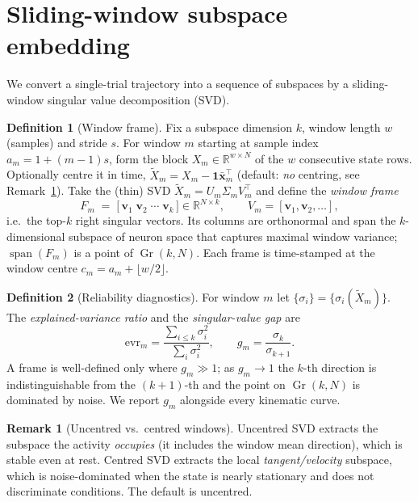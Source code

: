 \documentclass[11pt]{article}
\newcommand{\R}{\mathbb{R}}
\newcommand{\Gr}{\operatorname{Gr}}
\newcommand{\Span}{\operatorname{span}}
\theoremstyle{definition}
\newtheorem{definition}{Definition}
\newtheorem{remark}{Remark}
\begin{document}
\section{Sliding-window subspace embedding}
\label{sec:embed}

We convert a single-trial trajectory into a sequence of subspaces by a sliding-window
singular value decomposition (SVD).

\begin{definition}[Window frame]
\label{def:frame}
Fix a subspace dimension $k$, window length $w$ (samples) and stride $s$. For window
$m$ starting at sample index $a_m = 1 + (m-1)s$, form the block
$X_m \in \R^{w\times N}$ of the $w$ consecutive state rows. Optionally centre it in
time, $\tilde{X}_m = X_m - \mathbf{1}\bar{\bm{x}}_m^\top$ (default: \emph{no}
centring, see Remark~\ref{rem:center}). Take the (thin) SVD
$\tilde{X}_m = U_m \Sigma_m V_m^\top$ and define the \emph{window frame}
\begin{equation}
F_m \;=\; \big[\,\bm{v}_1 \; \bm{v}_2 \; \cdots \; \bm{v}_k\,\big]\in\R^{N\times k},
\qquad V_m = [\bm{v}_1,\bm{v}_2,\dots],
\end{equation}
i.e.\ the top-$k$ right singular vectors. Its columns are orthonormal and span the
$k$-dimensional subspace of neuron space that captures maximal window variance;
$\Span(F_m)$ is a point of $\Gr(k,N)$. Each frame is time-stamped at the window
centre $c_m = a_m + \lfloor w/2\rfloor$.
\end{definition}

\begin{definition}[Reliability diagnostics]
For window $m$ let $\{\sigma_i\}=\{\sigma_i(\tilde{X}_m)\}$. The \emph{explained-variance
ratio} and the \emph{singular-value gap} are
\begin{equation}
\mathrm{evr}_m = \frac{\sum_{i\le k}\sigma_i^2}{\sum_i \sigma_i^2},
\qquad
g_m = \frac{\sigma_k}{\sigma_{k+1}}.
\end{equation}
A frame is well-defined only where $g_m \gg 1$; as $g_m\to 1$ the $k$-th direction is
indistinguishable from the $(k{+}1)$-th and the point on $\Gr(k,N)$ is dominated by
noise. We report $g_m$ alongside every kinematic curve.
\end{definition}

\begin{remark}[Uncentred vs.\ centred windows]
\label{rem:center}
Uncentred SVD extracts the subspace the activity \emph{occupies} (it includes the
window mean direction), which is stable even at rest. Centred SVD extracts the local
\emph{tangent/velocity} subspace, which is noise-dominated when the state is nearly
stationary and does not discriminate conditions. The default is uncentred.
\end{remark}
\end{document}
